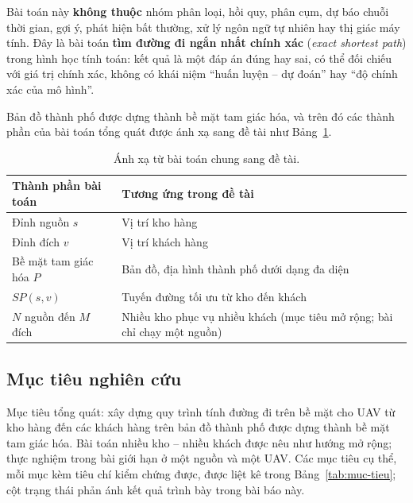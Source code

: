 Bài toán này \textbf{không thuộc} nhóm phân loại, hồi quy, phân cụm, dự báo chuỗi
thời gian, gợi ý, phát hiện bất thường, xử lý ngôn ngữ tự nhiên hay thị giác máy
tính. Đây là bài toán \textbf{tìm đường đi ngắn nhất chính xác} (\emph{exact
shortest path}) trong hình học tính toán: kết quả là một đáp án đúng hay sai, có
thể đối chiếu với giá trị chính xác, không có khái niệm ``huấn luyện -- dự đoán''
hay ``độ chính xác của mô hình''.

Bản đồ thành phố được dựng thành bề mặt tam giác hóa, và trên đó các thành phần
của bài toán tổng quát được ánh xạ sang đề tài như Bảng~\ref{tab:anh-xa-de-tai}.

\begin{table}[!t]
  \caption{Ánh xạ từ bài toán chung sang đề tài.}
  \label{tab:anh-xa-de-tai}
  {\fontsize{7}{9.3}\selectfont
  \begin{tabular}{@{}>{\raggedright\arraybackslash}p{70pt}>{\raggedright\arraybackslash}p{118pt}@{}}
    \toprule
    \textbf{Thành phần bài toán} & \textbf{Tương ứng trong đề tài} \\
    \midrule
    Đỉnh nguồn $s$ & Vị trí kho hàng \\
    Đỉnh đích $v$ & Vị trí khách hàng \\
    Bề mặt tam giác hóa $P$ & Bản đồ, địa hình thành phố dưới dạng đa diện \\
    $SP(s,v)$ & Tuyến đường tối ưu từ kho đến khách \\
    $N$ nguồn đến $M$ đích & Nhiều kho phục vụ nhiều khách (mục tiêu mở rộng; bài chỉ chạy một nguồn) \\
    \bottomrule
  \end{tabular}}
\end{table}

\subsection{Mục tiêu nghiên cứu}

Mục tiêu tổng quát: xây dựng quy trình tính đường đi trên bề mặt cho UAV từ kho
hàng đến các khách hàng trên bản đồ thành phố được dựng thành bề mặt tam giác
hóa. Bài toán nhiều kho -- nhiều khách được nêu như hướng mở rộng; thực nghiệm
trong bài giới hạn ở một nguồn và một UAV. Các mục tiêu cụ thể, mỗi mục kèm tiêu chí kiểm chứng được,
được liệt kê trong Bảng~\ref{tab:muc-tieu}; cột trạng thái phản ánh kết quả trình
bày trong bài báo này.

